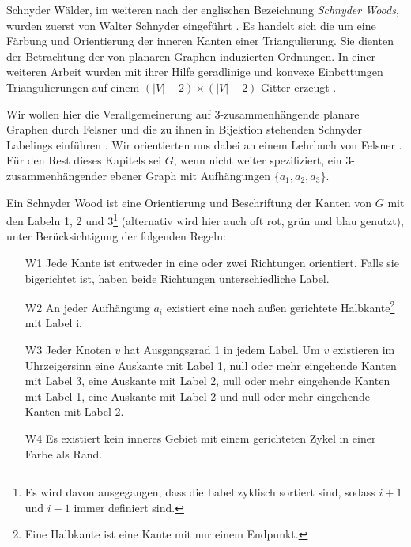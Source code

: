 Schnyder Wälder, im weiteren nach der englischen Bezeichnung \textit{Schnyder Woods}, wurden zuerst von Walter Schnyder eingeführt \cite{schnyder89}. Es handelt sich die um eine Färbung und Orientierung der inneren Kanten einer Triangulierung. Sie dienten der Betrachtung der von planaren Graphen induzierten Ordnungen. In einer weiteren Arbeit wurden mit ihrer Hilfe geradlinige und konvexe Einbettungen Triangulierungen auf einem $(|V|-2)\times(|V|-2)$ Gitter erzeugt \cite{schnyder90}.

Wir wollen hier die Verallgemeinerung auf 3-zusammenhängende planare Graphen durch Felsner und die zu ihnen in Bijektion stehenden Schnyder Labelings einführen \cite{felsner01}. Wir orientierten uns dabei an einem Lehrbuch von Felsner \cite{felsner12}. Für den Rest dieses Kapitels sei $G$, wenn nicht weiter spezifiziert, ein 3-zusammenhängender ebener Graph mit Aufhängungen $\{a_1,a_2,a_3\}$.

\begin{definition}\label{def_sw}
Ein Schnyder Wood ist eine Orientierung und Beschriftung der Kanten von $G$ mit den Labeln 1, 2 und 3\footnote{Es wird davon ausgegangen, dass die Label zyklisch sortiert sind, sodass $i+1$ und $i-1$ immer definiert sind.} (alternativ wird hier auch oft rot, grün und blau genutzt), unter Berücksichtigung der folgenden Regeln:
\begin{itemize}
\item[W1] Jede Kante ist entweder in eine oder zwei Richtungen orientiert. Falls sie bigerichtet ist, haben beide Richtungen unterschiedliche Label.
\item[W2] An jeder Aufhängung  $a_i$ existiert eine nach außen gerichtete Halbkante\footnote{Eine Halbkante ist eine Kante mit nur einem Endpunkt.} mit Label i. 
\item[W3] Jeder Knoten $v$ hat Ausgangsgrad 1 in jedem Label. Um $v$ existieren im Uhrzeigersinn eine Auskante mit Label 1, null oder mehr eingehende Kanten mit Label 3, eine Auskante mit Label 2, null oder mehr  eingehende Kanten mit Label 1, eine Auskante mit Label 2 und null oder mehr  eingehende Kanten mit Label 2.
\item[W4] Es existiert kein inneres Gebiet mit einem gerichteten Zykel in einer Farbe als Rand.
\end{itemize}
\end{definition}

